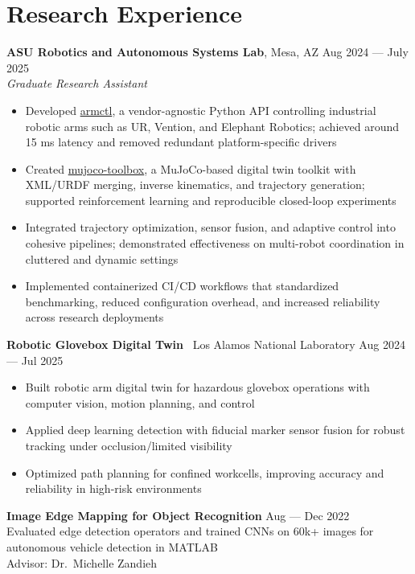 \documentclass[10pt]{article}
\begin{document}
\section*{Research Experience}
\textbf{ASU Robotics and Autonomous Systems Lab}, Mesa, AZ \hfill Aug 2024 --- July 2025 \\
\textit{Graduate Research Assistant}
\begin{itemize}
  \item Developed \href{https://github.com/MGross21/armctl}{armctl}, a vendor-agnostic Python API controlling industrial robotic arms such as UR, Vention, and Elephant Robotics; achieved around 15 ms latency and removed redundant platform-specific drivers
  \item Created \href{https://github.com/MGross21/mujoco-toolbox}{mujoco-toolbox}, a MuJoCo-based digital twin toolkit with XML/URDF merging, inverse kinematics, and trajectory generation; supported reinforcement learning and reproducible closed-loop experiments
  \item Integrated trajectory optimization, sensor fusion, and adaptive control into cohesive pipelines; demonstrated effectiveness on multi-robot coordination in cluttered and dynamic settings
  \item Implemented containerized CI/CD workflows that standardized benchmarking, reduced configuration overhead, and increased reliability across research deployments
\end{itemize}

\textbf{Robotic Glovebox Digital Twin} \textbar\ Los Alamos National Laboratory \hfill Aug 2024 --- Jul 2025
\begin{itemize}
  \item Built robotic arm digital twin for hazardous glovebox operations with computer vision, motion planning, and control
  \item Applied deep learning detection with fiducial marker sensor fusion for robust tracking under occlusion/limited visibility
  \item Optimized path planning for confined workcells, improving accuracy and reliability in high-risk environments
\end{itemize}

\textbf{Image Edge Mapping for Object Recognition} \hfill Aug --- Dec 2022\\
Evaluated edge detection operators and trained CNNs on 60k+ images for autonomous vehicle detection in MATLAB\\
Advisor: Dr.\ Michelle Zandieh
\end{document}
